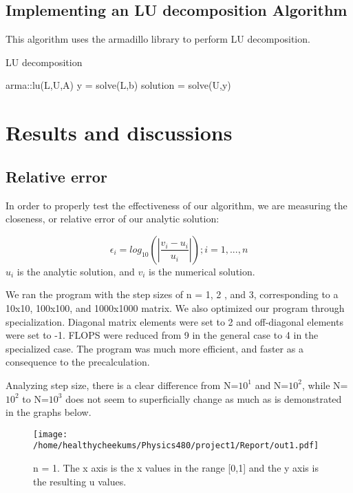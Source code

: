 \documentclass[10pt,showpacs,preprintnumbers,footinbib,amsmath,amssymb,aps,prl,twocolumn,groupedaddress,superscriptaddress,showkeys]{revtex4-1}
\begin{document}
        \subsection{Implementing an LU decomposition Algorithm}
This algorithm uses the armadillo library to perform LU decomposition.
\begin{algorithm}
\caption{LU decomposition}\label{euclid}
\begin{algorithmic}[1]
\Procedure{}{}
\State arma::lu(L,U,A)
\State y = solve(L,b)
\State solution = solve(U,y)
\EndProcedure
\end{algorithmic}
\end{algorithm}



\section{Results and discussions}

	\subsection{Relative error}

In order to properly test the effectiveness of our algorithm, we are measuring the closeness, or relative error of our analytic solution:

	\begin{equation}
	\epsilon_{i} = log_{10}(|\frac{v_{i}-u_{i}}{u_{i}}|)  ; i = 1,...,n
	\label{error}
	\end{equation}
$u_{i}$ is the analytic solution, and $v_{i}$ is the numerical solution.

 We ran the program with the step sizes of n = 1, 2 , and 3, corresponding to a 10x10, 100x100, and 1000x1000 matrix. We also optimized our program through specialization. Diagonal matrix elements were set to 2 and off-diagonal elements were set to -1. FLOPS were reduced from 9 in the general case to 4 in the specialized case. The program was much more efficient, and faster as a consequence to the precalculation. 

 Analyzing step size, there is a clear difference from N=$10^{1}$ and N=$10^{2}$, while N=$10^{2}$ to N=$10^{3}$ does not seem to superficially change as much as is demonstrated in the graphs below.
 
\begin{figure}[!ht]
	\centering
	\texttt{[image: /home/healthycheekums/Physics480/project1/Report/out1.pdf]}
	\label{uvx}
	\caption{ n = 1. The x axis is the x values in the range [0,1] and the y axis is the resulting u values.}
\end{figure}
\end{document}
